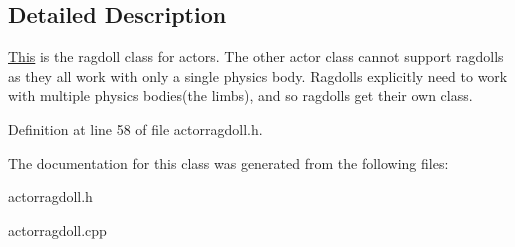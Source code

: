 \subsection{Detailed Description}
\hyperlink{structThis}{This} is the ragdoll class for actors. The other actor class cannot support ragdolls as they all work with only a single physics body. Ragdolls explicitly need to work with multiple physics bodies(the limbs), and so ragdolls get their own class. 

Definition at line 58 of file actorragdoll.h.



The documentation for this class was generated from the following files:\begin{DoxyCompactItemize}
\item 
actorragdoll.h\item 
actorragdoll.cpp\end{DoxyCompactItemize}
